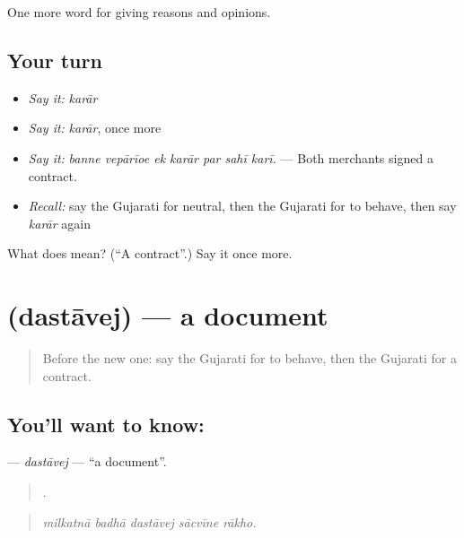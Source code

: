 \begin{grammarlens}[title={What you've built}]
One more word for giving reasons and opinions.
\end{grammarlens}

\subsection*{Your turn}
\begin{itemize}
\raggedright
  \item \emph{Say it:} \emph{karār}
  \item \emph{Say it:} \emph{karār}, once more
  \item \emph{Say it:} \emph{banne vepārīoe ek karār par sahī karī.} — Both merchants signed a contract.
  \item \emph{Recall:} say the Gujarati for neutral, then the Gujarati for to behave, then say \emph{karār} again
\end{itemize}

\begin{tcolorbox}[breakable,colback=teal!4,colframe=teal!35!black,title={Before you move on}]
What does  mean? (\textquotedblleft{}A contract\textquotedblright{}.) Say it once more.
\end{tcolorbox}
\section[\texorpdfstring{\gu{દસ્તાવેજ} (dastāvej)}{દસ્તાવેજ (dastāvej)}]{ (dastāvej) — a document}

\label{lesson:GU-C350-dastavej}



\begin{quote}
Before the new one: say the Gujarati for to behave, then the Gujarati for a contract.
\end{quote}

\subsection*{You'll want to know: }
\textbf{} — \emph{dastāvej} — \textquotedblleft{}a document\textquotedblright{}.

\begin{quote}
    .
\end{quote}

\begin{quote}
\emph{milkatnā badhā dastāvej sācvīne rākho.}
\end{quote}

